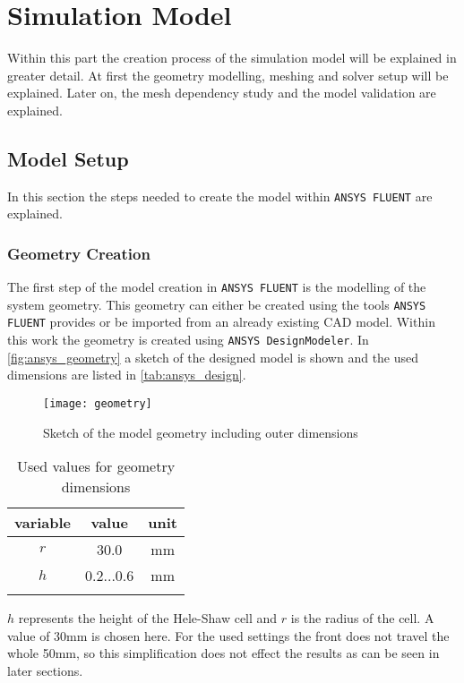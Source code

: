 \documentclass[../thesis.tex]{subfiles}
\begin{document}
\chapter{Simulation Model}
\label{chp:model}

Within this part the creation process of the simulation model will be explained in greater detail. At first the geometry modelling, meshing and solver setup will be explained. Later on, the mesh dependency study and the model validation are explained.

\section{Model Setup}
\label{sec:mod_setup}
In this section the steps needed to create the model within \texttt{ANSYS FLUENT} are explained.

\subsection{Geometry Creation}
The first step of the model creation in \texttt{ANSYS FLUENT} is the modelling of the system geometry. This geometry can either be created using the tools \texttt{ANSYS FLUENT} provides or be imported from an already existing CAD model. Within this work the geometry is created using \texttt{ANSYS DesignModeler}. In \autoref{fig:ansys_geometry} a sketch of the designed model is shown and the used dimensions are listed in \autoref{tab:ansys_design}.
\begin{figure}[htbp]
	\centering
	\texttt{[image: geometry]}
	\caption{Sketch of the model geometry including outer dimensions}
	\label{fig:ansys_geometry}
\end{figure}
\begin{table} [htb]
	\centering
	\caption{Used values for geometry dimensions}
	\begin{tabular}{ ccc }
		\hline
		variable & value & unit \\
		\hline
		$r$ & 30.0 & mm \\
		$h$ & 0.2...0.6 & mm \\
		\hline
		\label{tab:ansys_design}
	\end{tabular}
\end{table}

$h$ represents the height of the Hele-Shaw cell and $r$ is the radius of the cell. A value of 30mm is chosen here. For the used settings the front does not travel the whole 50mm, so this simplification does not effect the results as can be seen in later sections.
\end{document}
